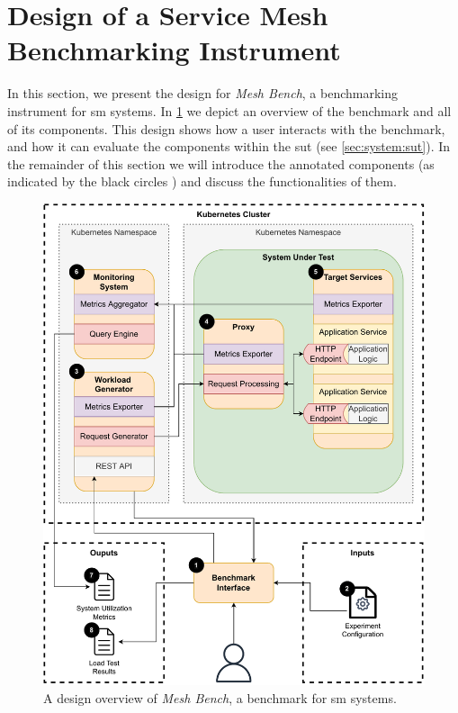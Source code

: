 \section{Design of a Service Mesh Benchmarking Instrument}
\label{sec:system:design}

In this section, we present the design for \textit{Mesh Bench}, a benchmarking instrument for \gls{sm} systems. In \cref{fig:benchmark-design} we depict an overview of the benchmark and all of its components. This design shows how a user interacts with the benchmark, and how it can evaluate the components within the \gls{sut} (see \cref{sec:system:sut}). In the remainder of this section we will introduce the annotated components (as indicated by the black circles \designref{ }) and discuss the functionalities of them.

\begin{figure}[!t]
    \centering
     
    \includegraphics[width=0.9\linewidth]{4_system_design/figures/detailed-benchmark-design.pdf}
    
    \caption[Design of \textit{Mesh Bench}.]{A design overview of \textit{Mesh Bench}, a benchmark for \gls{sm} systems.}
    
    \label{fig:benchmark-design}
\end{figure}



